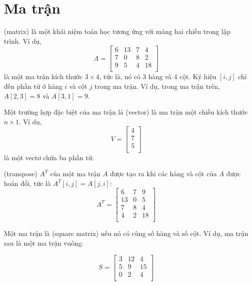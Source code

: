 \chapter{Ma trận}


 (matrix) là một khái niệm toán học
tương ứng với mảng hai chiều
trong lập trình. Ví dụ,
\[
A = 
 \begin{bmatrix}
  6 & 13 & 7 & 4 \\
  7 & 0 & 8 & 2 \\
  9 & 5 & 4 & 18 \\
 \end{bmatrix}
\]
là một ma trận kích thước $3 \times 4$, tức là,
nó có 3 hàng và 4 cột.
Ký hiệu $[i,j]$ chỉ đến
phần tử ở hàng $i$ và cột $j$
trong ma trận.
Ví dụ, trong ma trận trên,
$A[2,3]=8$ và $A[3,1]=9$.


Một trường hợp đặc biệt của ma trận là  (vector)
là ma trận một chiều kích thước $n \times 1$.
Ví dụ,
\[
V =
\begin{bmatrix}
4 \\
7 \\
5 \\
\end{bmatrix}
\]
là một vectơ chứa ba phần tử.


 (transpose) $A^T$ của một ma trận $A$
được tạo ra khi các hàng và cột của $A$
được hoán đổi, tức là $A^T[i,j]=A[j,i]$:
\[
A^T = 
 \begin{bmatrix}
  6 & 7 & 9 \\
  13 & 0 & 5 \\
  7 & 8 & 4 \\
  4 & 2 & 18 \\
 \end{bmatrix}
\]


Một ma trận là  (square matrix) nếu nó
có cùng số hàng và số cột.
Ví dụ, ma trận sau là một
ma trận vuông:

\[
S = 
 \begin{bmatrix}
  3 & 12 & 4  \\
  5 & 9 & 15  \\
  0 & 2 & 4 \\
 \end{bmatrix}
\]

